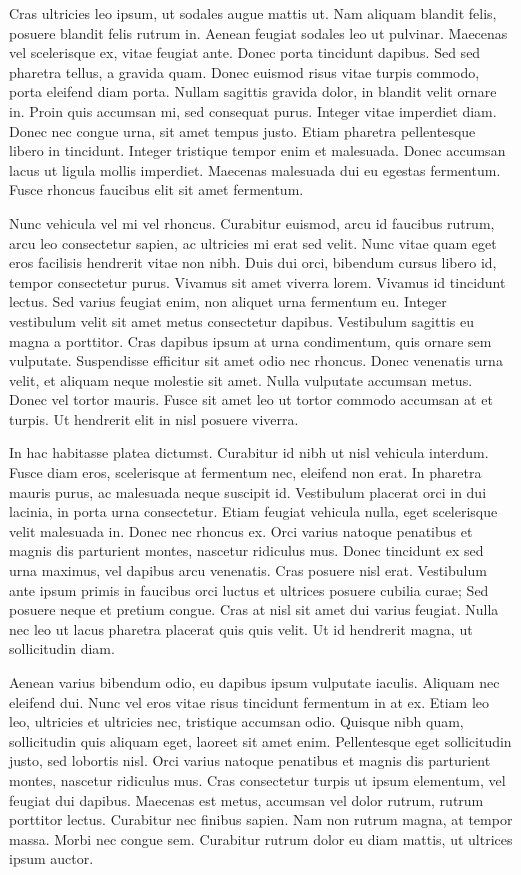 Cras ultricies leo ipsum, ut sodales augue mattis ut. Nam aliquam blandit felis, posuere blandit felis rutrum in. Aenean feugiat sodales leo ut pulvinar. Maecenas vel scelerisque ex, vitae feugiat ante. Donec porta tincidunt dapibus. Sed sed pharetra tellus, a gravida quam. Donec euismod risus vitae turpis commodo, porta eleifend diam porta. Nullam sagittis gravida dolor, in blandit velit ornare in. Proin quis accumsan mi, sed consequat purus. Integer vitae imperdiet diam. Donec nec congue urna, sit amet tempus justo. Etiam pharetra pellentesque libero in tincidunt. Integer tristique tempor enim et malesuada. Donec accumsan lacus ut ligula mollis imperdiet. Maecenas malesuada dui eu egestas fermentum. Fusce rhoncus faucibus elit sit amet fermentum.

Nunc vehicula vel mi vel rhoncus. Curabitur euismod, arcu id faucibus rutrum, arcu leo consectetur sapien, ac ultricies mi erat sed velit. Nunc vitae quam eget eros facilisis hendrerit vitae non nibh. Duis dui orci, bibendum cursus libero id, tempor consectetur purus. Vivamus sit amet viverra lorem. Vivamus id tincidunt lectus. Sed varius feugiat enim, non aliquet urna fermentum eu. Integer vestibulum velit sit amet metus consectetur dapibus. Vestibulum sagittis eu magna a porttitor. Cras dapibus ipsum at urna condimentum, quis ornare sem vulputate. Suspendisse efficitur sit amet odio nec rhoncus. Donec venenatis urna velit, et aliquam neque molestie sit amet. Nulla vulputate accumsan metus. Donec vel tortor mauris. Fusce sit amet leo ut tortor commodo accumsan at et turpis. Ut hendrerit elit in nisl posuere viverra.

In hac habitasse platea dictumst. Curabitur id nibh ut nisl vehicula interdum. Fusce diam eros, scelerisque at fermentum nec, eleifend non erat. In pharetra mauris purus, ac malesuada neque suscipit id. Vestibulum placerat orci in dui lacinia, in porta urna consectetur. Etiam feugiat vehicula nulla, eget scelerisque velit malesuada in. Donec nec rhoncus ex. Orci varius natoque penatibus et magnis dis parturient montes, nascetur ridiculus mus. Donec tincidunt ex sed urna maximus, vel dapibus arcu venenatis. Cras posuere nisl erat. Vestibulum ante ipsum primis in faucibus orci luctus et ultrices posuere cubilia curae; Sed posuere neque et pretium congue. Cras at nisl sit amet dui varius feugiat. Nulla nec leo ut lacus pharetra placerat quis quis velit. Ut id hendrerit magna, ut sollicitudin diam.

Aenean varius bibendum odio, eu dapibus ipsum vulputate iaculis. Aliquam nec eleifend dui. Nunc vel eros vitae risus tincidunt fermentum in at ex. Etiam leo leo, ultricies et ultricies nec, tristique accumsan odio. Quisque nibh quam, sollicitudin quis aliquam eget, laoreet sit amet enim. Pellentesque eget sollicitudin justo, sed lobortis nisl. Orci varius natoque penatibus et magnis dis parturient montes, nascetur ridiculus mus. Cras consectetur turpis ut ipsum elementum, vel feugiat dui dapibus. Maecenas est metus, accumsan vel dolor rutrum, rutrum porttitor lectus. Curabitur nec finibus sapien. Nam non rutrum magna, at tempor massa. Morbi nec congue sem. Curabitur rutrum dolor eu diam mattis, ut ultrices ipsum auctor.